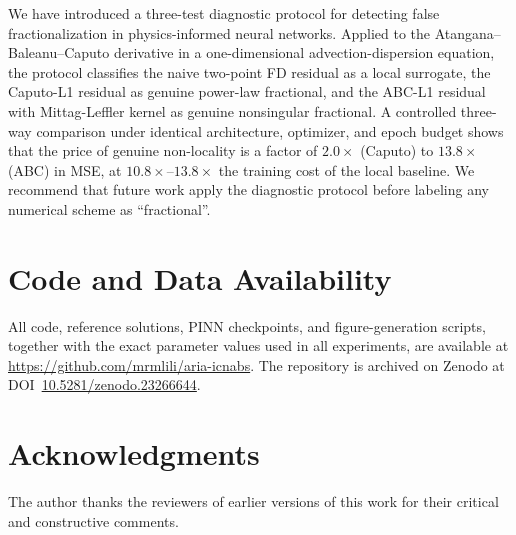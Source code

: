 \documentclass[11pt]{article}
\begin{document}
We have introduced a three-test diagnostic protocol for detecting false fractionalization in physics-informed neural networks. Applied to the Atangana--Baleanu--Caputo derivative in a one-dimensional advection-dispersion equation, the protocol classifies the naive two-point FD residual as a local surrogate, the Caputo-L1 residual as genuine power-law fractional, and the ABC-L1 residual with Mittag-Leffler kernel as genuine nonsingular fractional. A controlled three-way comparison under identical architecture, optimizer, and epoch budget shows that the price of genuine non-locality is a factor of \(2.0\times\) (Caputo) to \(13.8\times\) (ABC) in MSE, at \(10.8\times\)--\(13.8\times\) the training cost of the local baseline. We recommend that future work apply the diagnostic protocol before labeling any numerical scheme as ``fractional''.

\section*{Code and Data Availability}
\label{sec:code}
All code, reference solutions, PINN checkpoints, and figure-generation scripts, together with the exact parameter values used in all experiments, are available at \url{https://github.com/mrmlili/aria-icnabs}. The repository is archived on Zenodo at DOI~\href{https://doi.org/10.5281/zenodo.23266644}{10.5281/zenodo.23266644}.

\section*{Acknowledgments}
The author thanks the reviewers of earlier versions of this work for their critical and constructive comments.
\end{document}
